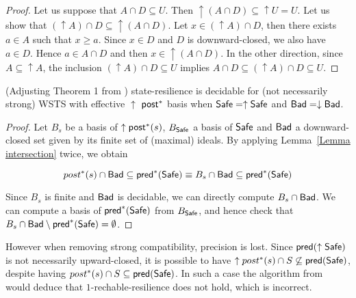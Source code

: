 \begin{proof}
Let us suppose that $A \cap D \subseteq U$. Then ${\uparrow (A \cap D)} \subseteq {\uparrow U} = U$.
Let us show that $({\uparrow A}) \cap D \subseteq {\uparrow (A \cap D)}$.
Let $x \in ({\uparrow A}) \cap D$, then there exists $a \in A$ such that $x \geq a$.
Since $x \in D$ and $D$ is downward-closed, we also have $a \in D$.
Hence $a \in A \cap D$ and then $x \in { \uparrow (A \cap D)}$.
In the other direction,
since $A \subseteq {\uparrow A}$, the inclusion
$({\uparrow  A}) \cap D \subseteq U$ implies
$A \cap D \subseteq ({\uparrow  A}) \cap D \subseteq U$.
\end{proof}



\begin{theorem}{(Adjusting Theorem 1 from \cite{DBLP:journals/corr/abs-2108-00889})}\label{post srp}
{\sc state-resilience} is decidable for (not necessarily strong) WSTS with effective 
$\uparrow$ $\textsf{post}^*$ basis
when
$\textsf{Safe}=\uparrow \textsf{Safe}$
and $\textsf{Bad}=\downarrow \textsf{Bad}$.
\end{theorem}


\begin{proof}
Let $B_s$ be a basis of $\uparrow \textsf{post}^*(s)$, $B_{\textsf{Safe}}$ a basis of $\textsf{Safe}$
and $\textsf{Bad}$ a downward-closed set given by its finite set of (maximal) ideals.
By applying Lemma~\ref{Lemma intersection} twice, we obtain

$$ post^*(s) \cap \textsf{Bad} \subseteq \textsf{pred}^*(\textsf{Safe}) \equiv B_s \cap \textsf{Bad} \subseteq \textsf{pred}^*(\textsf{Safe})$$


Since $B_s$ is finite and $\textsf{Bad}$ is decidable, we can directly compute $ B_s \cap \textsf{Bad}$.
We can compute a basis of $\textsf{pred}^*(\textsf{Safe})$ from $B_{\textsf{Safe}}$, and hence check that $B_s \cap \textsf{Bad} \setminus \textsf{pred}^*(\textsf{Safe}) = \emptyset$. 
\end{proof}

%
%



However when removing strong compatibility, precision is lost.
Since $\textsf{pred}(\uparrow \textsf{Safe})$ is not necessarily upward-closed, it is possible to have 
 $\uparrow post^* (s) \cap S \not\subseteq \textsf{pred}(\textsf{Safe})$,
despite having 
$post^* (s) \cap S \subseteq \textsf{pred}( \textsf{Safe})$.
In such a case the algorithm from
\cite{DBLP:conf/gg/Ozkan22} would deduce that $1$-rechable-resilience does not hold,
which is incorrect.

